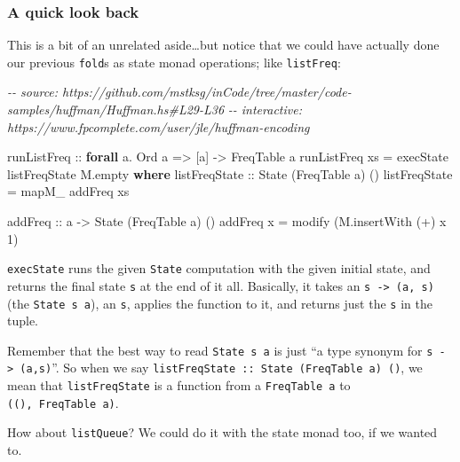 \documentclass[]{article}
\newenvironment{Shaded}{}{}
\newcommand{\CommentTok}[1]{\textcolor[rgb]{0.38,0.63,0.69}{\textit{#1}}}
\newcommand{\DataTypeTok}[1]{\textcolor[rgb]{0.56,0.13,0.00}{#1}}
\newcommand{\DecValTok}[1]{\textcolor[rgb]{0.25,0.63,0.44}{#1}}
\newcommand{\FunctionTok}[1]{\textcolor[rgb]{0.02,0.16,0.49}{#1}}
\newcommand{\KeywordTok}[1]{\textcolor[rgb]{0.00,0.44,0.13}{\textbf{#1}}}
\newcommand{\NormalTok}[1]{#1}
\newcommand{\OperatorTok}[1]{\textcolor[rgb]{0.40,0.40,0.40}{#1}}
\newcommand{\OtherTok}[1]{\textcolor[rgb]{0.00,0.44,0.13}{#1}}
\begin{document}
\subsubsection{A quick look back}\label{a-quick-look-back}

This is a bit of an unrelated aside\ldots but notice that we could have actually
done our previous \texttt{fold}s as state monad operations; like
\texttt{listFreq}:

\begin{Shaded}
\begin{Highlighting}[]
\CommentTok{{-}{-} source: https://github.com/mstksg/inCode/tree/master/code{-}samples/huffman/Huffman.hs\#L29{-}L36}
\CommentTok{{-}{-} interactive: https://www.fpcomplete.com/user/jle/huffman{-}encoding}

\OtherTok{runListFreq ::} \KeywordTok{forall}\NormalTok{ a}\OperatorTok{.} \DataTypeTok{Ord}\NormalTok{ a }\OtherTok{=\textgreater{}}\NormalTok{ [a] }\OtherTok{{-}\textgreater{}} \DataTypeTok{FreqTable}\NormalTok{ a}
\NormalTok{runListFreq xs }\OtherTok{=}\NormalTok{ execState listFreqState M.empty}
  \KeywordTok{where}
\OtherTok{    listFreqState ::} \DataTypeTok{State}\NormalTok{ (}\DataTypeTok{FreqTable}\NormalTok{ a) ()}
\NormalTok{    listFreqState }\OtherTok{=} \FunctionTok{mapM\_}\NormalTok{ addFreq xs}

\OtherTok{    addFreq ::}\NormalTok{ a }\OtherTok{{-}\textgreater{}} \DataTypeTok{State}\NormalTok{ (}\DataTypeTok{FreqTable}\NormalTok{ a) ()}
\NormalTok{    addFreq x }\OtherTok{=}\NormalTok{ modify (M.insertWith (}\OperatorTok{+}\NormalTok{) x }\DecValTok{1}\NormalTok{)}
\end{Highlighting}
\end{Shaded}

\texttt{execState} runs the given \texttt{State} computation with the given
initial state, and returns the final state \texttt{s} at the end of it all.
Basically, it takes an \texttt{s\ -\textgreater{}\ (a,\ s)} (the
\texttt{State\ s\ a}), an \texttt{s}, applies the function to it, and returns
just the \texttt{s} in the tuple.

Remember that the best way to read \texttt{State\ s\ a} is just ``a type synonym
for \texttt{s\ -\textgreater{}\ (a,s)}''. So when we say
\texttt{listFreqState\ ::\ State\ (FreqTable\ a)\ ()}, we mean that
\texttt{listFreqState} is a function from a \texttt{FreqTable\ a} to
\texttt{((),\ FreqTable\ a)}.

How about \texttt{listQueue}? We could do it with the state monad too, if we
wanted to.
\end{document}
